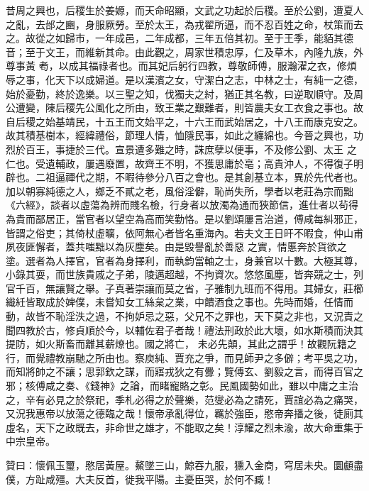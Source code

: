 \begin{pinyinscope}
 昔周之興也，后稷生於姜嫄，而天命昭顯，文武之功起於后稷。至於公劉，遭夏人之亂，去邰之豳，身服厥勞。至於太王，為戎翟所逼，而不忍百姓之命，杖策而去之。故從之如歸市，一年成邑，二年成都，三年五倍其初。至于王季，能貊其德音；至于文王，而維新其命。由此觀之，周家世積忠厚，仁及草木，內隆九族，外尊事黃
 耇，以成其福祿者也。而其妃后躬行四教，尊敬師傅，服瀚濯之衣，修煩辱之事，化天下以成婦道。是以漢濱之女，守潔白之志，中林之士，有純一之德，始於憂勤，終於逸樂。以三聖之知，伐獨夫之紂，猶正其名教，曰逆取順守。及周公遭變，陳后稷先公風化之所由，致王業之艱難者，則皆農夫女工衣食之事也。故自后稷之始基靖民，十五王而文始平之，十六王而武始居之，十八王而康克安之。故其積基樹本，經緯禮俗，節理人情，恤隱民事，如此之纏綿也。今晉之興也，功烈於百王，事捷於三代。宣景遭多難之時，誅庶孽以便事，不及修公劉、太王
 之仁也。受遺輔政，屢遇廢置，故齊王不明，不獲思庸於亳；高貴沖人，不得復子明辟也。二祖逼禪代之期，不暇待參分八百之會也。是其創基立本，異於先代者也。加以朝寡純德之人，鄉乏不貳之老，風俗淫僻，恥尚失所，學者以老莊為宗而黜《六經》，談者以虛蕩為辨而賤名檢，行身者以放濁為通而狹節信，進仕者以茍得為貴而鄙居正，當官者以望空為高而笑勤恪。是以劉頌屢言治道，傅咸每糾邪正，皆謂之俗吏；其倚杖虛曠，依阿無心者皆名重海內。若夫文王日旰不暇食，仲山甫夙夜匪懈者，蓋共嗤黜以為灰塵矣。由是毀譽亂於善惡
 之實，情慝奔於貨欲之塗。選者為人擇官，官者為身擇利，而執鈞當軸之士，身兼官以十數。大極其尊，小錄其耍，而世族貴戚之子弟，陵邁超越，不拘資次。悠悠風塵，皆奔競之士，列官千百，無讓賢之舉。子真著崇讓而莫之省，子雅制九班而不得用。其婦女，莊櫛織紝皆取成於婢僕，未嘗知女工絲枲之業，中饋酒食之事也。先時而婚，任情而動，故皆不恥淫泆之過，不拘妒忌之惡，父兄不之罪也，天下莫之非也，又況責之聞四教於古，修貞順於今，以輔佐君子者哉！禮法刑政於此大壞，如水斯積而決其提防，如火斯畜而離其薪燎也。國之將亡，
 未必先顛，其此之謂乎！故觀阮籍之行，而覺禮教崩馳之所由也。察庾純、賈充之爭，而見師尹之多僻；考平吳之功，而知將帥之不讓；思郭欽之謀，而寤戎狄之有釁；覽傅玄、劉毅之言，而得百官之邪；核傅咸之奏、《錢神》之論，而睹寵賂之彰。民風國勢如此，雖以中庸之主治之，辛有必見之於祭祀，季札必得之於聲樂，范燮必為之請死，賈誼必為之痛哭，又況我惠帝以放蕩之德臨之哉！懷帝承亂得位，羈於強臣，愍帝奔播之後，徒廁其虛名，天下之政既去，非命世之雄才，不能取之矣！淳耀之烈未渝，故大命重集于中宗皇帝。



 贊曰：懷佩玉璽，愍居黃屋。鰲墜三山，鯨吞九服，獯入金商，穹居未央。圜顱盡僕，方趾咸殭。大夫反首，徙我平陽。主憂臣哭，於何不臧！



\end{pinyinscope}